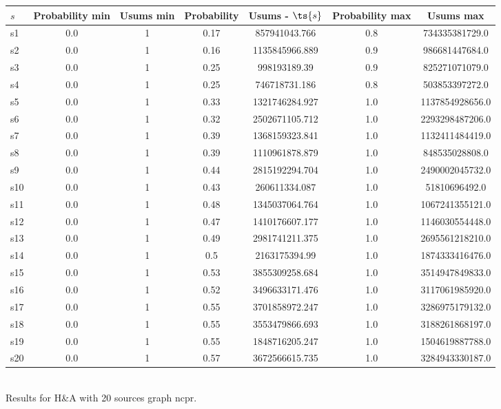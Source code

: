 \documentclass{article}
\begin{document}
\noindent\begin{tabular}{|l|c|c|c|c|c|c|}
\hline
$s$& Probability min & Usums min & Probability & Usums - $\ts{s}$ & Probability max & Usums max\\
\hline
s1 &0.0 & 1 & 0.17 & 857941043.766 & 0.8 & 734335381729.0\\
\hline
s2 &0.0 & 1 & 0.16 & 1135845966.889 & 0.9 & 986681447684.0\\
\hline
s3 &0.0 & 1 & 0.25 & 998193189.39 & 0.9 & 825271071079.0\\
\hline
s4 &0.0 & 1 & 0.25 & 746718731.186 & 0.8 & 503853397272.0\\
\hline
s5 &0.0 & 1 & 0.33 & 1321746284.927 & 1.0 & 1137854928656.0\\
\hline
s6 &0.0 & 1 & 0.32 & 2502671105.712 & 1.0 & 2293298487206.0\\
\hline
s7 &0.0 & 1 & 0.39 & 1368159323.841 & 1.0 & 1132411484419.0\\
\hline
s8 &0.0 & 1 & 0.39 & 1110961878.879 & 1.0 & 848535028808.0\\
\hline
s9 &0.0 & 1 & 0.44 & 2815192294.704 & 1.0 & 2490002045732.0\\
\hline
s10 &0.0 & 1 & 0.43 & 260611334.087 & 1.0 & 51810696492.0\\
\hline
s11 &0.0 & 1 & 0.48 & 1345037064.764 & 1.0 & 1067241355121.0\\
\hline
s12 &0.0 & 1 & 0.47 & 1410176607.177 & 1.0 & 1146030554448.0\\
\hline
s13 &0.0 & 1 & 0.49 & 2981741211.375 & 1.0 & 2695561218210.0\\
\hline
s14 &0.0 & 1 & 0.5 & 2163175394.99 & 1.0 & 1874333416476.0\\
\hline
s15 &0.0 & 1 & 0.53 & 3855309258.684 & 1.0 & 3514947849833.0\\
\hline
s16 &0.0 & 1 & 0.52 & 3496633171.476 & 1.0 & 3117061985920.0\\
\hline
s17 &0.0 & 1 & 0.55 & 3701858972.247 & 1.0 & 3286975179132.0\\
\hline
s18 &0.0 & 1 & 0.55 & 3553479866.693 & 1.0 & 3188261868197.0\\
\hline
s19 &0.0 & 1 & 0.55 & 1848716205.247 & 1.0 & 1504619887788.0\\
\hline
s20 &0.0 & 1 & 0.57 & 3672566615.735 & 1.0 & 3284943330187.0\\
\hline
\end{tabular}\\

\noindent Results for H\&A with 20 sources graph ncpr.
\end{document}
